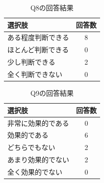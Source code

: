 \begin{table}[H]
    \caption{Q8の回答結果}
    \label{table:evaluation03-1}
    \centering
    \begin{tabular}{lc}
      \hline
      選択肢 & 回答数 \\
      \hline \hline
      ある程度判断できる & 8 \\
      ほとんど判断できる & 0 \\
      少し判断できる & 2 \\
      全く判断できない & 0 \\
      \hline
    \end{tabular}
\end{table}

\begin{table}[H]
    \caption{Q9の回答結果}
    \label{table:evaluation03-2}
    \centering
    \begin{tabular}{lc}
      \hline
      選択肢 & 回答数 \\
      \hline \hline
      非常に効果的である & 0 \\
      効果的である & 6 \\
      どちらでもない & 2 \\
      あまり効果的でない & 2 \\
      全く効果的でない & 0 \\
      \hline
    \end{tabular}
\end{table}
